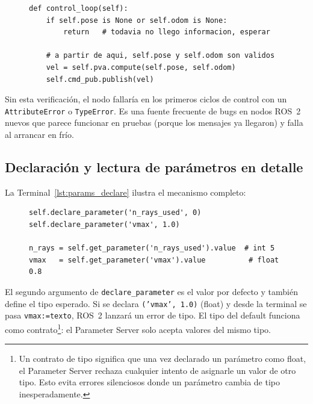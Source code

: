 \begin{figure}[H]
\centering
\begin{lstlisting}[style=python, caption={Verificación de datos disponibles al inicio del loop de control.}, label={lst:none_check}]
def control_loop(self):
    if self.pose is None or self.odom is None:
        return   # todavia no llego informacion, esperar

    # a partir de aqui, self.pose y self.odom son validos
    vel = self.pva.compute(self.pose, self.odom)
    self.cmd_pub.publish(vel)
\end{lstlisting}
\end{figure}

Sin esta verificación, el nodo fallaría en los primeros ciclos de control con un \texttt{AttributeError} o \texttt{TypeError}. Es una fuente frecuente de bugs en nodos ROS~2 nuevos que parece funcionar en pruebas (porque los mensajes ya llegaron) y falla al arrancar en frío.

\subsection{Declaración y lectura de parámetros en detalle}

La Terminal~\ref{lst:params_declare} ilustra el mecanismo completo:

\begin{figure}[H]
\centering
\begin{lstlisting}[style=python, caption={Declaración y lectura de parámetros en el nodo.}, label={lst:params_declare}]
self.declare_parameter('n_rays_used', 0)
self.declare_parameter('vmax', 1.0)

n_rays = self.get_parameter('n_rays_used').value  # int 5
vmax   = self.get_parameter('vmax').value          # float 0.8
\end{lstlisting}
\end{figure}

El segundo argumento de \texttt{declare\_parameter} es el valor por defecto y también define el tipo esperado. Si se declara \texttt{('vmax', 1.0)} (float) y desde la terminal se pasa \texttt{vmax:=texto}, ROS~2 lanzará un error de tipo. El tipo del default funciona como contrato\footnote{Un contrato de tipo significa que una vez declarado un parámetro como float, el Parameter Server rechaza cualquier intento de asignarle un valor de otro tipo. Esto evita errores silenciosos donde un parámetro cambia de tipo inesperadamente.}: el Parameter Server solo acepta valores del mismo tipo.

